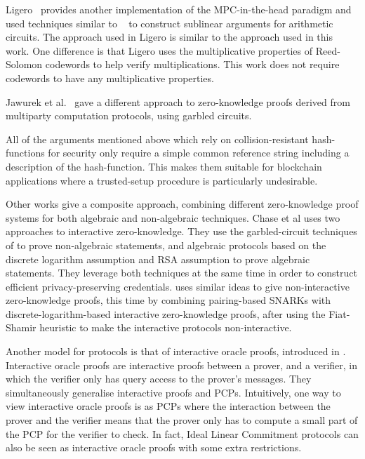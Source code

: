 Ligero~\cite{CCS:AHIV17} provides another implementation of the MPC-in-the-head paradigm and used techniques similar to ~\cite{BootleCGGHJ17} to construct sublinear arguments for arithmetic circuits. The approach used in Ligero is similar to the approach used in this work. One difference is that Ligero uses the multiplicative properties of Reed-Solomon codewords to help verify multiplications. This work does not require codewords to have any multiplicative properties.

Jawurek et al.~\cite{JawurekKO13} gave a different approach to zero-knowledge proofs derived from multiparty computation protocols, using garbled circuits.

All of the arguments mentioned above which rely on collision-resistant hash-functions for security only require a simple common reference string including a description of the hash-function. This makes them suitable for blockchain applications where a trusted-setup procedure is particularly undesirable.

Other works give a composite approach, combining different zero-knowledge proof systems for both algebraic and non-algebraic techniques. Chase et al \cite{ChaseGM16} uses two approaches to interactive zero-knowledge. They use the garbled-circuit techniques of \cite{JawurekKO13} to prove non-algebraic statements, and algebraic protocols based on the discrete logarithm assumption and RSA assumption to prove algebraic statements. They leverage both techniques at the same time in order to construct efficient privacy-preserving credentials. \cite{AgrawalGM18} uses similar ideas to give non-interactive zero-knowledge proofs, this time by combining pairing-based SNARKs with discrete-logarithm-based interactive zero-knowledge proofs, after using the Fiat-Shamir heuristic to make the interactive protocols non-interactive.

Another model for protocols is that of interactive oracle proofs, introduced in \cite{Ben-SassonCS16}. Interactive oracle proofs are interactive proofs between a prover, and a verifier, in which the verifier only has query access to the prover's messages. They simultaneously generalise interactive proofs and PCPs. Intuitively, one way to view interactive oracle proofs is as PCPs where the interaction between the prover and the verifier means that the prover only has to compute a small part of the PCP for the verifier to check. In fact, Ideal Linear Commitment protocols can also be seen as interactive oracle proofs with some extra restrictions.

